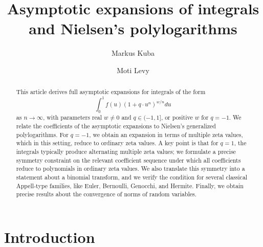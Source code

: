 \documentclass[10pt,reqno,a4paper]{amsart}%
\theoremstyle{definition}
\begin{document}
\author[M.~Kuba]{Markus Kuba}
\address{Markus Kuba\\
Department Applied Mathematics and Physics\\
University of Applied Sciences - Technikum Wien\\
H\"ochst\"adtplatz 5, 1200 Wien}
\author[M.~Levy]{Moti Levy}
\address{Moti Levy\\
The Open University of Israel, Department of Mathematics and Computer Science}
\title[Asymptotic expansions of integrals and Nielsen's polylogarithms]{Asymptotic expansions of integrals and Nielsen's polylogarithms}

\begin{abstract}
This article derives full asymptotic expansions for
integrals of the form
\[
\int_{0}^{1}f(u)(1+q\cdot u^{n})^{w/n}du
\]
as $n\rightarrow\infty$, with parameters real $w\neq 0$ and $q\in(-1,1]$, or positive $w$ for $q=-1$.
We relate the coefficients of the asymptotic expansions to Nielsen's
generalized polylogarithms. For $q=-1$, we obtain an expansion in terms of
multiple zeta values, which in this setting, reduce to ordinary zeta values. A
key point is that for $q=1$, the integrals typically produce alternating
multiple zeta values; we formulate a precise symmetry constraint on the
relevant coefficient sequence under which all coefficients reduce to
polynomials in ordinary zeta values. We also translate this symmetry into a
statement about a binomial transform, and we verify the condition for several
classical Appell-type families, like Euler, Bernoulli, Genocchi, and Hermite.
Finally, we obtain precise results about the convergence of norms of random variables.

\end{abstract}
\maketitle


\section{Introduction}
\end{document}
